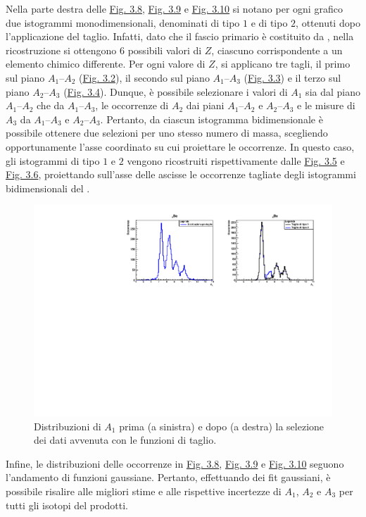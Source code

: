 \documentclass[12pt,a4paper,twoside]{report}
\begin{document}
	Nella parte destra delle \hyperref[fig:berillium1]{Fig. 3.8}, \hyperref[fig:berillium2]{Fig. 3.9} e \hyperref[fig:berillium3]{Fig. 3.10} si notano per ogni grafico due istogrammi monodimensionali, denominati di tipo $1$ e di tipo $2$, ottenuti dopo l'applicazione del taglio. Infatti, dato che il fascio primario è costituito da , nella ricostruzione si ottengono $6$ possibili valori di $Z$, ciascuno corrispondente a un elemento chimico differente. Per ogni valore di $Z$, si applicano tre tagli, il primo sul piano $A_1$--$A_2$ (\hyperref[fig:a1]{Fig. 3.2}), il secondo sul piano $A_1$--$A_3$ (\hyperref[fig:a2]{Fig. 3.3}) e il terzo sul piano $A_2$--$A_3$ (\hyperref[fig:a3]{Fig. 3.4}). Dunque, è possibile selezionare i valori di $A_1$ sia dal piano $A_1$--$A_2$ che da $A_1$--$A_3$, le occorrenze di $A_2$ dai piani $A_1$--$A_2$ e $A_2$--$A_3$ e le misure di $A_3$ da $A_1$--$A_3$ e $A_2$--$A_3$. Pertanto, da ciascun istogramma bidimensionale è possibile ottenere due selezioni per uno stesso numero di massa, scegliendo opportunamente l'asse coordinato su cui proiettare le occorrenze. In questo caso, gli istogrammi di tipo $1$ e $2$ vengono ricostruiti rispettivamente dalle \hyperref[fig:a1_cut]{Fig. 3.5} e \hyperref[fig:a2_cut]{Fig. 3.6}, proiettando sull'asse delle ascisse le occorrenze tagliate degli istogrammi bidimensionali del .
	\begin{figure}[H]
		\centering
		\includegraphics[width=1.0\linewidth]{c_Berillum1.pdf}
		\caption{Distribuzioni di $A_1$ prima (a sinistra) e dopo (a destra) la selezione dei dati avvenuta con le funzioni di taglio.}
		\label{fig:berillium1}
	\end{figure}
	Infine, le distribuzioni delle occorrenze in \hyperref[fig:berillium1]{Fig. 3.8}, \hyperref[fig:berillium2]{Fig. 3.9} e \hyperref[fig:berillium3]{Fig. 3.10} seguono l'andamento di funzioni gaussiane. Pertanto, effettuando dei fit gaussiani, è possibile risalire alle migliori stime e alle rispettive incertezze di $A_1$, $A_2$ e $A_3$ per tutti gli isotopi del  prodotti.
\end{document}
